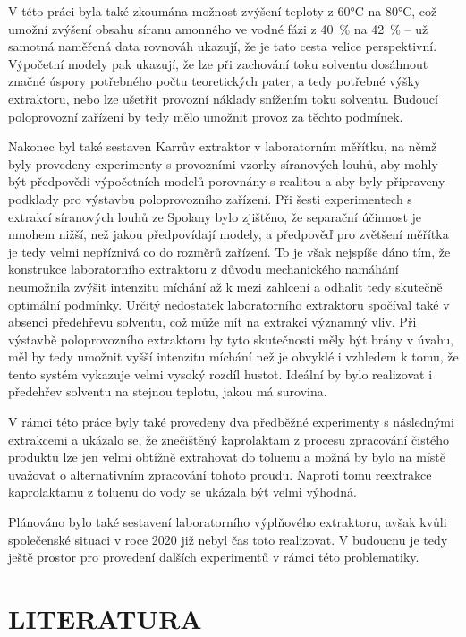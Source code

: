 \documentclass[a4paper, 12pt]{article}
\begin{document}
V této práci byla také zkoumána možnost zvýšení teploty z 60°C na 80°C, což umožní zvýšení obsahu síranu amonného ve vodné fázi z 40~\% na 42~\% -- už samotná naměřená data rovnováh ukazují, že je tato cesta velice perspektivní.
Výpočetní modely pak ukazují, že lze při zachování toku solventu dosáhnout značné úspory potřebného počtu teoretických pater, a tedy potřebné výšky extraktoru, nebo lze ušetřit provozní náklady snížením toku solventu.
Budoucí poloprovozní zařízení by tedy mělo umožnit provoz za těchto podmínek.

Nakonec byl také sestaven Karrův extraktor v laboratorním měřítku, na němž byly provedeny experimenty s provozními vzorky síranových louhů, aby mohly být předpovědi výpočetních modelů porovnány s realitou a aby byly připraveny podklady pro výstavbu poloprovozního zařízení.
Při šesti experimentech s extrakcí síranových louhů ze Spolany bylo zjištěno, že separační účinnost je mnohem nižší, než jakou předpovídají modely, a předpověď pro zvětšení měřítka je tedy velmi nepříznivá co do rozměrů zařízení.
To je však nejspíše dáno tím, že konstrukce laboratorního extraktoru z důvodu mechanického namáhání neumožnila zvýšit intenzitu míchání až k mezi zahlcení a odhalit tedy skutečně optimální podmínky.
Určitý nedostatek laboratorního extraktoru spočíval také v absenci předehřevu solventu, což může mít na extrakci významný vliv.
Při výstavbě poloprovozního extraktoru by tyto skutečnosti měly být brány v úvahu, měl by tedy umožnit vyšší intenzitu míchání než je obvyklé i vzhledem k tomu, že tento systém vykazuje velmi vysoký rozdíl hustot.
Ideální by bylo realizovat i předehřev solventu na stejnou teplotu, jakou má surovina.

V rámci této práce byly také provedeny dva předběžné experimenty s následnými extrakcemi a ukázalo se, že znečištěný kaprolaktam z procesu zpracování čistého produktu lze jen velmi obtížně extrahovat do toluenu a možná by bylo na místě uvažovat o alternativním zpracování tohoto proudu.
Naproti tomu reextrakce kaprolaktamu z toluenu do vody se ukázala být velmi výhodná.

Plánováno bylo také sestavení laboratorního výplňového extraktoru, avšak kvůli společenské situaci v roce 2020 již nebyl čas toto realizovat.
V budoucnu je tedy ještě prostor pro provedení dalších experimentů v rámci této problematiky.


\newpage \section*{LITERATURA}
\renewcommand\refname{\vskip -1cm} %

\end{document}
